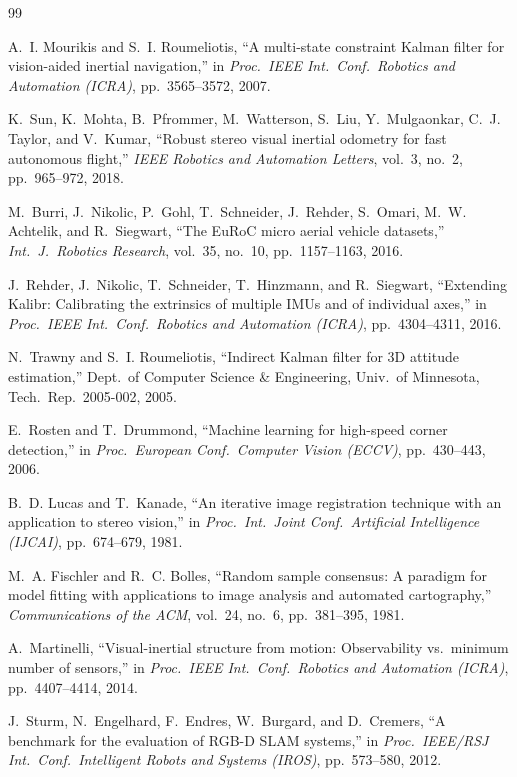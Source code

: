 \documentclass[conference]{IEEEtran}
\begin{document}
\begin{thebibliography}{99}

A.~I. Mourikis and S.~I. Roumeliotis, ``A multi-state constraint Kalman filter for vision-aided inertial navigation,'' in \emph{Proc.\ IEEE Int.\ Conf.\ Robotics and Automation (ICRA)}, pp.~3565--3572, 2007.

K.~Sun, K.~Mohta, B.~Pfrommer, M.~Watterson, S.~Liu, Y.~Mulgaonkar, C.~J. Taylor, and V.~Kumar, ``Robust stereo visual inertial odometry for fast autonomous flight,'' \emph{IEEE Robotics and Automation Letters}, vol.~3, no.~2, pp.~965--972, 2018.

M.~Burri, J.~Nikolic, P.~Gohl, T.~Schneider, J.~Rehder, S.~Omari, M.~W. Achtelik, and R.~Siegwart, ``The EuRoC micro aerial vehicle datasets,'' \emph{Int.\ J.\ Robotics Research}, vol.~35, no.~10, pp.~1157--1163, 2016.

J.~Rehder, J.~Nikolic, T.~Schneider, T.~Hinzmann, and R.~Siegwart, ``Extending Kalibr: Calibrating the extrinsics of multiple IMUs and of individual axes,'' in \emph{Proc.\ IEEE Int.\ Conf.\ Robotics and Automation (ICRA)}, pp.~4304--4311, 2016.

N.~Trawny and S.~I. Roumeliotis, ``Indirect Kalman filter for 3D attitude estimation,'' Dept.\ of Computer Science \& Engineering, Univ.\ of Minnesota, Tech.\ Rep.~2005-002, 2005.

E.~Rosten and T.~Drummond, ``Machine learning for high-speed corner detection,'' in \emph{Proc.\ European Conf.\ Computer Vision (ECCV)}, pp.~430--443, 2006.

B.~D. Lucas and T.~Kanade, ``An iterative image registration technique with an application to stereo vision,'' in \emph{Proc.\ Int.\ Joint Conf.\ Artificial Intelligence (IJCAI)}, pp.~674--679, 1981.

M.~A. Fischler and R.~C. Bolles, ``Random sample consensus: A paradigm for model fitting with applications to image analysis and automated cartography,'' \emph{Communications of the ACM}, vol.~24, no.~6, pp.~381--395, 1981.

A.~Martinelli, ``Visual-inertial structure from motion: Observability vs.\ minimum number of sensors,'' in \emph{Proc.\ IEEE Int.\ Conf.\ Robotics and Automation (ICRA)}, pp.~4407--4414, 2014.

J.~Sturm, N.~Engelhard, F.~Endres, W.~Burgard, and D.~Cremers, ``A benchmark for the evaluation of RGB-D SLAM systems,'' in \emph{Proc.\ IEEE/RSJ Int.\ Conf.\ Intelligent Robots and Systems (IROS)}, pp.~573--580, 2012.


\end{thebibliography}
\end{document}
